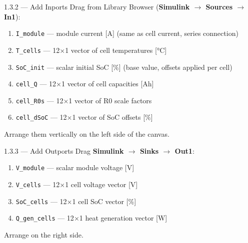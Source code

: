 \documentclass[11pt,a4paper]{article}
\begin{document}
\begin{guistep}{1.3.2 — Add Inports}
Drag from Library Browser (\textbf{Simulink $\to$ Sources $\to$ In1}):
\begin{enumerate}
    \item \texttt{I\_module} — module current [A] (same as cell current, series connection)
    \item \texttt{T\_cells} — 12$\times$1 vector of cell temperatures [\si{\degreeCelsius}]
    \item \texttt{SoC\_init} — scalar initial SoC [\%] (base value, offsets applied per cell)
    \item \texttt{cell\_Q} — 12$\times$1 vector of cell capacities [Ah]
    \item \texttt{cell\_R0s} — 12$\times$1 vector of R0 scale factors
    \item \texttt{cell\_dSoC} — 12$\times$1 vector of SoC offsets [\%]
\end{enumerate}
Arrange them vertically on the left side of the canvas.
\end{guistep}

\begin{guistep}{1.3.3 — Add Outports}
Drag \textbf{Simulink $\to$ Sinks $\to$ Out1}:
\begin{enumerate}
    \item \texttt{V\_module} — scalar module voltage [V]
    \item \texttt{V\_cells} — 12$\times$1 cell voltage vector [V]
    \item \texttt{SoC\_cells} — 12$\times$1 cell SoC vector [\%]
    \item \texttt{Q\_gen\_cells} — 12$\times$1 heat generation vector [W]
\end{enumerate}
Arrange on the right side.
\end{guistep}
\end{document}
